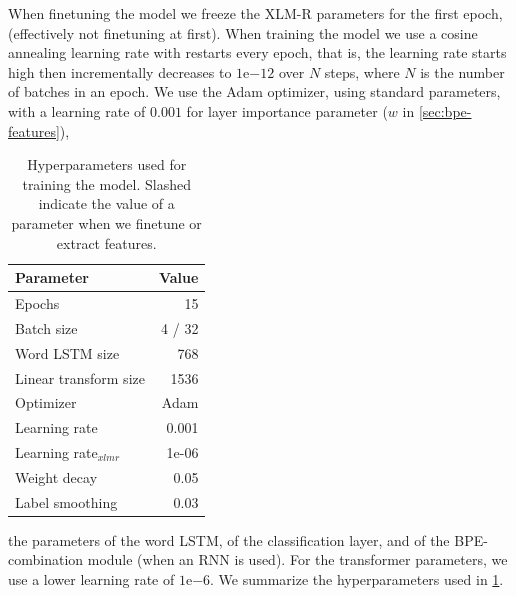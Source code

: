 \documentclass[11pt]{article}
\begin{document}
                 When finetuning the model we freeze the XLM-R
     parameters for the first epoch, (effectively not finetuning at
     first).  When training the model we use a cosine annealing
     learning rate with restarts every epoch, that is, the learning
     rate starts high then incrementally decreases to
     $1\mathrm{e}{-12}$ over $N$ steps, where $N$ is the number of
     batches in an epoch.  We use the Adam optimizer, using standard
     parameters, with a learning rate of $0.001$ for layer importance
     parameter ($w$ in \cref{sec:bpe-features}),
    \begin{table}
		\centering
		\begin{tabular}{lr} \\
			Parameter & Value \\
			\hline
			Epochs & 15 \\
			Batch size & 4 / 32 \\
            Word LSTM size & 768 \\
            Linear transform size & 1536 \\
			Optimizer & Adam \\
			Learning rate & 0.001 \\
			Learning rate$_{xlmr}$ & 1e-06 \\
            Weight decay & 0.05 \\
			Label smoothing & 0.03 \\
		\end{tabular}
    		\caption{\label{tab:parameters} Hyperparameters used for
     training the model. Slashed indicate the value of a parameter
     when we finetune or extract features.}
	\end{table}
        the parameters of the word LSTM, of the classification layer, and
     of the BPE-combination module (when an RNN is used).  For the transformer
     parameters, we use a lower learning rate of $1\mathrm{e}{-6}$. We
     summarize the hyperparameters used in \cref{tab:parameters}.
\end{document}
